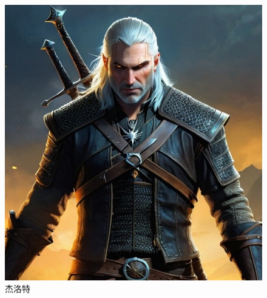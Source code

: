\begin{figure}[!htb]
\begin{minipage}{0.45\textwidth}
        \includegraphics[width=\textwidth]{./photo/Witcher_Geralt.jpg}
        \caption{杰洛特}
        \label{fig:geralt2}
    \end{minipage}
    \vspace{-0.3cm} %
\end{figure}